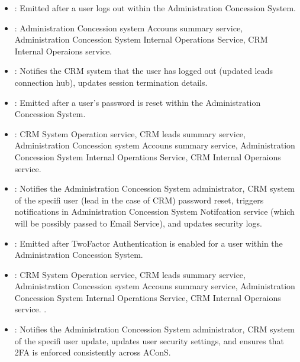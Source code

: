 \documentclass[letterpaper,10pt,english]{sphinxmanual}
\begin{document}
\sphinxAtStartPar
{}
\begin{itemize}
\item {} 
\sphinxAtStartPar
{}: Emitted after a user logs out within the Administration Concession System.

\item {} 
\sphinxAtStartPar
{}: Administration Concession system Accouns summary service, Administration Concession System Internal Operations Service, CRM Internal Operaions service.

\item {} 
\sphinxAtStartPar
{}: Notifies the CRM system that the user has logged out (updated leads connection hub), updates session termination details.

\end{itemize}

\sphinxAtStartPar
{}
\begin{itemize}
\item {} 
\sphinxAtStartPar
{}: Emitted after a user’s password is reset within the Administration Concession System.

\item {} 
\sphinxAtStartPar
{}: CRM System Operation service, CRM leads summary service,  Administration Concession system Accouns summary service, Administration Concession System Internal Operations Service, CRM Internal Operaions service.

\item {} 
\sphinxAtStartPar
{}: Notifies the Administration Concession System administrator, CRM system of the specifi user (lead in the case of CRM) password reset, triggers notifications in Administration Concession System Notifcation service (which will be possibly passed to Email Service), and updates security logs.

\end{itemize}

\sphinxAtStartPar
{}
\begin{itemize}
\item {} 
\sphinxAtStartPar
{}: Emitted after Two\sphinxhyphen{}Factor Authentication is enabled for a user within the Administration Concession System.

\item {} 
\sphinxAtStartPar
{}: CRM System Operation service, CRM leads summary service,  Administration Concession system Accouns summary service, Administration Concession System Internal Operations Service, CRM Internal Operaions service. .

\item {} 
\sphinxAtStartPar
{}: Notifies the Administration Concession System administrator, CRM system of the specifi user update, updates user security settings, and ensures that 2FA is enforced consistently across AConS.

\end{itemize}
\end{document}
